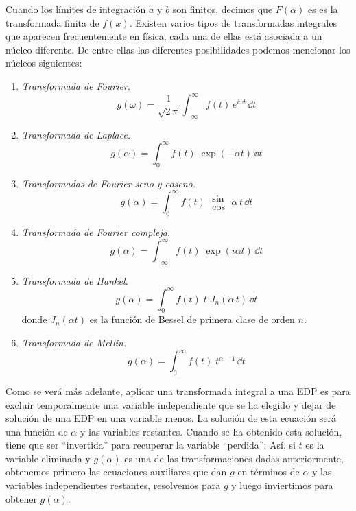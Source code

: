 \par
Cuando los límites de integración $a$ y $b$ son finitos, decimos que $F(\alpha)$ es es la transformada finita de $f(x)$. Existen varios tipos de transformadas integrales que aparecen frecuentemente en física, cada una de ellas está asociada a un núcleo diferente. De entre ellas las diferentes posibilidades podemos mencionar los núcleos siguientes:
\begin{enumerate}
\item \emph{Transformada de Fourier.}
\begin{equation}
g (\omega) = \dfrac{1}{\sqrt{2 \, \pi}} \int_{-\infty}^{\infty} f(t) \, e^{i \omega t} \, \dd{t}
\label{eq:ecuacion_07_01}
\end{equation}
\item \emph{Transformada de Laplace.}
\begin{equation}
g (\alpha)= \int_{0}^{\infty} f(t) \; \exp(-\alpha t) \, \dd{t}
\label{eq:ecuacion_7_02}
\end{equation}
\item \emph{Transformadas de Fourier seno y coseno.}
\begin{equation}
g (\alpha)= \int_{0}^{\infty} f(t) \; \substack{ \textstyle \sin \\[0.5em] \textstyle \cos} \; \alpha \, t \,  \dd{t}
\label{eq:ecuacion_7_03}
\end{equation}
\item \emph{Transformada de Fourier compleja.}
\begin{equation}
g (\alpha)= \int_{-\infty}^{\infty} f(t) \; \exp(i \alpha t) \, \dd{t}
\label{eq:ecuacion_7_04}
\end{equation}
\item \emph{Transformada de Hankel.}
\begin{equation}
g (\alpha)= \int_{0}^{\infty} f(t) \; t \; J_{n} (\alpha \, t) \, \dd{t}
\label{eq:ecuacion_7_05}
\end{equation}
donde $J_{n}(\alpha t)$ es la función de Bessel de primera clase de orden $n$.
\item \emph{Transformada de Mellin.}
\begin{equation}
g (\alpha)= \int_{0}^{\infty} f(t) \; t^{\alpha-1} \, \dd{t}
\label{eq:ecuacion_7_06}
\end{equation}
\end{enumerate}
Como se verá más adelante, aplicar una transformada integral a una EDP es para excluir temporalmente una variable independiente que se ha elegido y dejar de solución de una EDP en una variable menos. La solución de esta ecuación será una función de $\alpha$ y las variables restantes. Cuando se ha obtenido esta solución, tiene que ser \enquote{invertida} para recuperar la variable \enquote{perdida}: Así, si $t$ es la variable eliminada y $g (\alpha)$ es una de las transformaciones dadas anteriormente, obtenemos primero las ecuaciones auxiliares que dan $g$ en términos de $\alpha$ y las variables independientes restantes, resolvemos para $g$ y luego inviertimos para obtener $g(\alpha)$.
